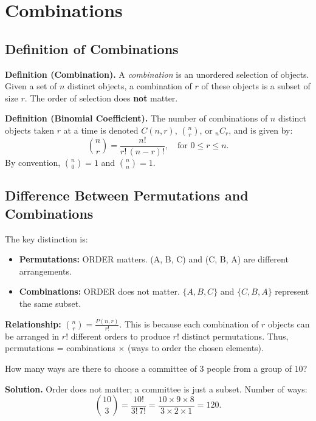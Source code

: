 \documentclass[11pt,a4paper]{article}
\begin{document}
\section{Combinations}

\subsection{Definition of Combinations}

\textbf{Definition (Combination).} A \textit{combination} is an unordered selection of objects. Given a set of $n$ distinct objects, a combination of $r$ of these objects is a subset of size $r$. The order of selection does \textbf{not} matter.

\textbf{Definition (Binomial Coefficient).} The number of combinations of $n$ distinct objects taken $r$ at a time is denoted $C(n, r)$, $\binom{n}{r}$, or ${}_nC_r$, and is given by:
\begin{equation*}
    \binom{n}{r} = \frac{n!}{r! \, (n-r)!}, \quad \text{for } 0 \leq r \leq n.
\end{equation*}
By convention, $\binom{n}{0} = 1$ and $\binom{n}{n} = 1$.

\subsection{Difference Between Permutations and Combinations}

The key distinction is:
\begin{itemize}[label=$\bullet$]
    \item \textbf{Permutations:} ORDER matters. (A, B, C) and (C, B, A) are different arrangements.
    \item \textbf{Combinations:} ORDER does not matter. $\{A, B, C\}$ and $\{C, B, A\}$ represent the same subset.
\end{itemize}

\textbf{Relationship:} $\displaystyle\binom{n}{r} = \frac{P(n, r)}{r!}$. This is because each combination of $r$ objects can be arranged in $r!$ different orders to produce $r!$ distinct permutations. Thus, permutations = combinations $\times$ (ways to order the chosen elements).

\begin{example}
How many ways are there to choose a committee of $3$ people from a group of $10$?

\textbf{Solution.} Order does not matter; a committee is just a subset. Number of ways:
\begin{equation*}
    \binom{10}{3} = \frac{10!}{3! \, 7!} = \frac{10 \times 9 \times 8}{3 \times 2 \times 1} = 120.
\end{equation*}
\end{example}
\end{document}

